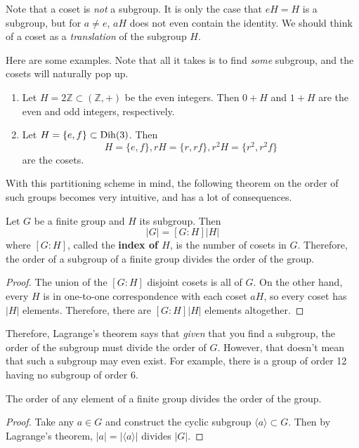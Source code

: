   Note that a coset is \textit{not} a subgroup. It is only the case that $eH = H$ is a subgroup, but for $a \neq e$, $aH$ does not even contain the identity. We should think of a coset as a \textit{translation} of the subgroup $H$. 

  \begin{example}
    Here are some examples. Note that all it takes is to find \textit{some} subgroup, and the cosets will naturally pop up. 
    \begin{enumerate}
      \item Let $H = 2 \mathbb{Z} \subset (\mathbb{Z}, +)$ be the even integers. Then $0 + H$ and $1 + H$ are the even and odd integers, respectively. 
      \item Let $H = \{e, f\} \subset \Dih(3)$. Then 
      \begin{equation}
        H = \{e, f\}, rH = \{r, rf\}, r^2 H = \{r^2, r^2 f\} 
      \end{equation}
      are the cosets. 
    \end{enumerate}
  \end{example}

  With this partitioning scheme in mind, the following theorem on the order of such groups becomes very intuitive, and has a lot of consequences. 

  \begin{theorem}
    Let $G$ be a finite group and $H$ its subgroup. Then 
    \begin{equation}
      |G| = [G:H] |H|
    \end{equation}
    where $[G:H]$, called the \textbf{index of $H$}, is the number of cosets in $G$. Therefore, the order of a subgroup of a finite group divides the order of the group. 
  \end{theorem}
  \begin{proof}
    The union of the $[G:H]$ disjoint cosets is all of $G$. On the other hand, every $H$ is in one-to-one correspondence with each coset $aH$, so every coset has $|H|$ elements. Therefore, there are $[G:H] |H|$ elements altogether. 
  \end{proof}

  Therefore, Lagrange's theorem says that \textit{given} that you find a subgroup, the order of the subgroup must divide the order of $G$. However, that doesn't mean that such a subgroup may even exist. For example, there is a group of order 12 having no subgroup of order 6. 

  \begin{corollary}
    The order of any element of a finite group divides the order of the group. 
  \end{corollary}
  \begin{proof}
    Take any $a \in G$ and construct the cyclic subgroup $\langle a \rangle \subset G$. Then by Lagrange's theorem, $|a| = |\langle a \rangle|$ divides $|G|$. 
  \end{proof}

